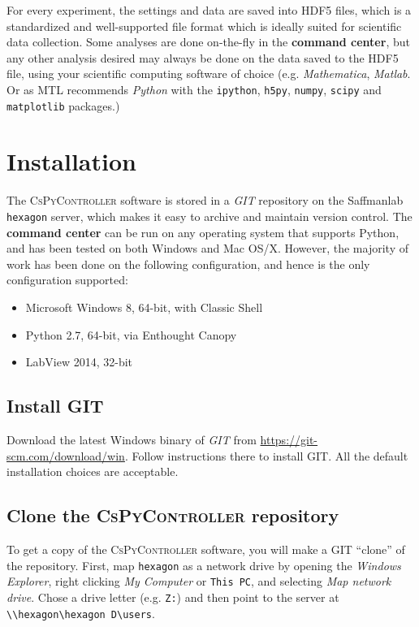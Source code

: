 \documentclass[pdftex,11pt,letterpaper]{article}
\begin{document}
For every experiment, the settings and data are saved into \textsc{HDF5} files, which is a standardized and well-supported file format which is ideally suited for scientific data collection.  Some analyses are done on-the-fly in the \textbf{command center}, but any other analysis desired may always be done on the data saved to the HDF5 file, using your scientific computing software of choice (e.g. \textit{Mathematica}, \textit{Matlab}.  Or as MTL recommends \textit{Python} with the \texttt{ipython}, \texttt{h5py}, \texttt{numpy}, \texttt{scipy} and \texttt{matplotlib} packages.)

\section{Installation}

The \textsc{CsPyController} software is stored in a \textit{GIT} repository on the Saffmanlab \texttt{hexagon} server, which makes it easy to archive and maintain version control.  The \textbf{command center} can be run on any operating system that supports Python, and has been tested on both Windows and Mac OS/X.  However, the majority of work has been done on the following configuration, and hence is the only configuration supported:

\begin{itemize}
\item Microsoft Windows 8, 64-bit, with Classic Shell
\item Python 2.7, 64-bit, via Enthought Canopy
\item LabView 2014, 32-bit
\end{itemize}

\subsection{Install GIT}

Download the latest Windows binary of \textit{GIT} from \url{https://git-scm.com/download/win}.  Follow instructions there to install GIT.  All the default installation choices are acceptable.

\subsection{Clone the \textsc{CsPyController} repository}

To get a copy of the \textsc{CsPyController} software, you will make a GIT ``clone'' of the repository.  First, map \texttt{hexagon} as a network drive by opening the \textit{Windows Explorer}, right clicking \textit{My Computer} or \texttt{This PC}, and selecting \textit{Map network drive}.  Chose a drive letter (e.g. \texttt{Z:}) and then point to the server at \texttt{\textbackslash \textbackslash hexagon\textbackslash hexagon D\textbackslash users}.
\end{document}
